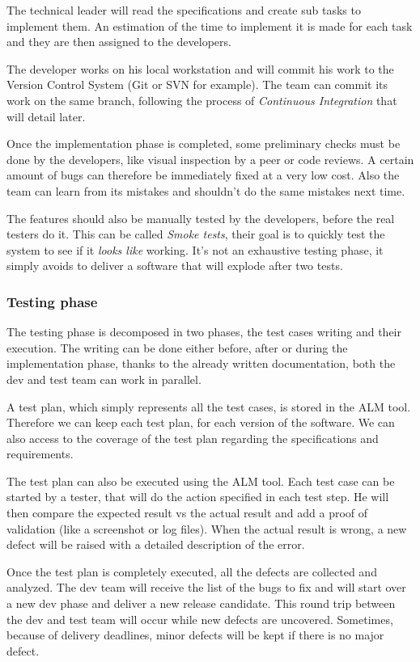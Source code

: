 The technical leader will read the specifications and create sub tasks to
implement them.
An estimation of the time to implement it is made for each task and they are
then assigned to the developers.

The developer works on his local workstation and will commit his work to the
Version Control System (Git or SVN for example).
The team can commit its work on the same branch, following the process of
\textit{Continuous Integration} that will detail later.

Once the implementation phase is completed, some preliminary checks must be
done by the developers, like visual inspection by a peer or code reviews.
A certain amount of bugs can therefore be immediately fixed at a very low cost.
Also the team can learn from its mistakes and shouldn't do the same mistakes
next time.

The features should also be manually tested by the developers, before the real
testers do it.
This can be called \textit{Smoke tests}, their goal is to quickly test the
system to see if it \textit{looks like} working.
It's not an exhaustive testing phase, it simply avoids to deliver a software
that will explode after two tests.

\subsubsection{Testing phase}
The testing phase is decomposed in two phases, the test cases writing and
their execution.
The writing can be done either before, after or during the implementation
phase, thanks to the already written documentation, both the dev and test
team can work in parallel.

A test plan, which simply represents all the test cases, is stored in the ALM
tool.
Therefore we can keep each test plan, for each version of the software.
We can also access to the coverage of the test plan regarding the
specifications and requirements.

The test plan can also be executed using the ALM tool.
Each test case can be started by a tester, that will do the action specified in
each test step.
He will then compare the expected result vs the actual result and add a proof
of validation (like a screenshot or log files).
When the actual result is wrong, a new defect will be raised with a detailed
description of the error.

Once the test plan is completely executed, all the defects are collected and
analyzed.
The dev team will receive the list of the bugs to fix and will start over a
new dev phase and deliver a new release candidate.
This round trip between the dev and test team will occur while new defects
are uncovered.
Sometimes, because of delivery deadlines, minor defects will be kept if there
is no major defect.

